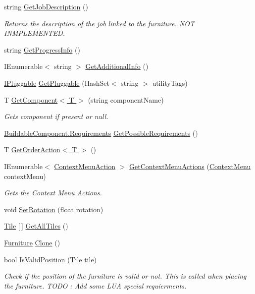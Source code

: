 \begin{DoxyCompactItemize}
string \hyperlink{class_furniture_aaa94fa81a9ef7c7fd7fcc5854fd1ce61}{Get\+Job\+Description} ()
\begin{DoxyCompactList}\small\item\em Returns the description of the job linked to the furniture. N\+OT I\+N\+M\+P\+L\+E\+M\+E\+N\+T\+ED. \end{DoxyCompactList}\item 
string \hyperlink{class_furniture_a19a8b804f1bcf3d3b9db7e184e17b250}{Get\+Progress\+Info} ()
\item 
I\+Enumerable$<$ string $>$ \hyperlink{class_furniture_a0834aab5c42424b7c700feeac78a8cc5}{Get\+Additional\+Info} ()
\item 
\hyperlink{interface_project_porcupine_1_1_power_network_1_1_i_pluggable}{I\+Pluggable} \hyperlink{class_furniture_ac28ca12fba747625e26a10382ed47c84}{Get\+Pluggable} (Hash\+Set$<$ string $>$ utility\+Tags)
\item 
T \hyperlink{class_furniture_adfea45b46ac394267dbd99b8ee521728}{Get\+Component$<$ T $>$} (string component\+Name)
\begin{DoxyCompactList}\small\item\em Gets component if present or null. \end{DoxyCompactList}\item 
\hyperlink{class_project_porcupine_1_1_buildable_1_1_components_1_1_buildable_component_a331a0d67512b8b402c04c8cf31c0ca8a}{Buildable\+Component.\+Requirements} \hyperlink{class_furniture_aeddb6c1525947e6517f4c27ca992c1ab}{Get\+Possible\+Requirements} ()
\item 
T \hyperlink{class_furniture_aa6e7a8ac556cf6b05148257752bb5a58}{Get\+Order\+Action$<$ T $>$} ()
\item 
I\+Enumerable$<$ \hyperlink{class_context_menu_action}{Context\+Menu\+Action} $>$ \hyperlink{class_furniture_ac89ee5662bc36695cc7d5b8eaa246f43}{Get\+Context\+Menu\+Actions} (\hyperlink{class_context_menu}{Context\+Menu} context\+Menu)
\begin{DoxyCompactList}\small\item\em Gets the Context Menu Actions. \end{DoxyCompactList}\item 
void \hyperlink{class_furniture_ac11b1b3875abe21193844976a90032de}{Set\+Rotation} (float rotation)
\item 
\hyperlink{class_tile}{Tile} \mbox{[}$\,$\mbox{]} \hyperlink{class_furniture_a80906e15f092dd5b46c60b4b973dd36f}{Get\+All\+Tiles} ()
\item 
\hyperlink{class_furniture}{Furniture} \hyperlink{class_furniture_a65087cef9d54e54fa04cd816cd8a0386}{Clone} ()
\item 
bool \hyperlink{class_furniture_a290abe92f7472bfdf3dc1f0096e29e0b}{Is\+Valid\+Position} (\hyperlink{class_tile}{Tile} tile)
\begin{DoxyCompactList}\small\item\em Check if the position of the furniture is valid or not. This is called when placing the furniture. T\+O\+DO \+: Add some L\+UA special requierments. \end{DoxyCompactList}\end{DoxyCompactItemize}
